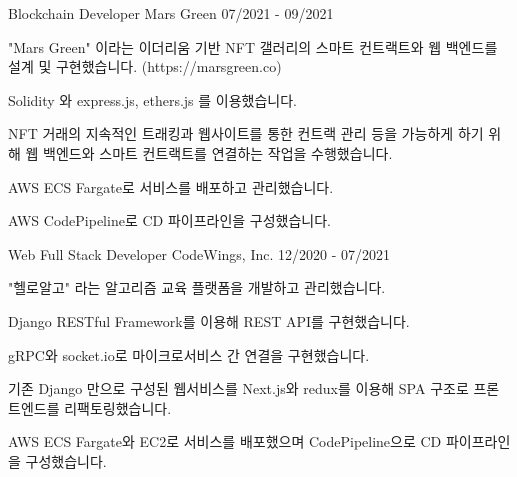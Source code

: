 \cventry
{Blockchain Developer} %
{Mars Green} %
{} %
{07/2021 - 09/2021} %
\begin{cvitems}
\item {"Mars Green" 이라는 이더리움 기반 NFT 갤러리의 스마트 컨트랙트와 웹 백엔드를 설계 및 구현했습니다. (https://marsgreen.co)}
\item {Solidity 와 express.js, ethers.js 를 이용했습니다.}
\item {NFT 거래의 지속적인 트래킹과 웹사이트를 통한 컨트랙 관리 등을 가능하게 하기 위해 웹 백엔드와 스마트 컨트랙트를 연결하는 작업을 수행했습니다.}
\item {AWS ECS Fargate로 서비스를 배포하고 관리했습니다.}
\item {AWS CodePipeline로 CD 파이프라인을 구성했습니다.}
\end{cvitems}

\cventry
{Web Full Stack Developer} %
{CodeWings, Inc.} %
{} %
{12/2020 - 07/2021} %
\begin{cvitems}
\item {"헬로알고" 라는 알고리즘 교육 플랫폼을 개발하고 관리했습니다.}
\item {Django RESTful Framework를 이용해 REST API를 구현했습니다.}
\item {gRPC와 socket.io로 마이크로서비스 간 연결을 구현했습니다.}
\item {기존 Django 만으로 구성된 웹서비스를 Next.js와 redux를 이용해 SPA 구조로 프론트엔드를 리팩토링했습니다.}
\item {AWS ECS Fargate와 EC2로 서비스를 배포했으며 CodePipeline으로 CD 파이프라인을 구성했습니다.}
\end{cvitems}
